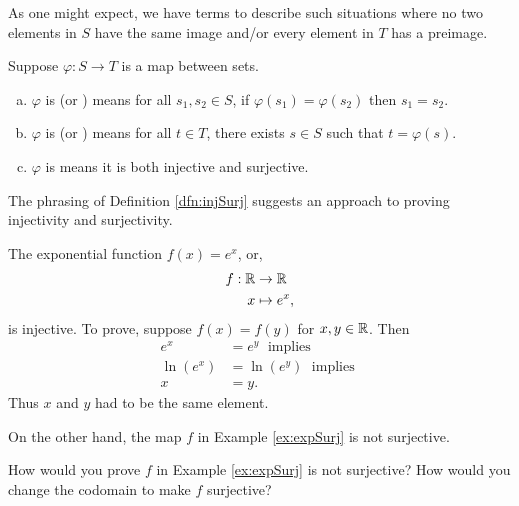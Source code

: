\documentclass[../UNABRIDGEDalgebraNotesMSRI-UP2016.tex]{subfiles}
\begin{document}
\begin{frame}
As one might expect, we have terms to describe such situations where no two elements in $S$ have the same image and/or every element in $T$ has a preimage.

\smallGap
\begin{dfn}\label{dfn:injSurj}
Suppose $\varphi:S\to T$ is a map between sets.
\begin{enumerate}[(a)]
\item\label{dfn:inj} $\varphi$ is  (or ) means for all $s_1,s_2\in S$, if $\varphi(s_1)=\varphi(s_2)$ then $s_1=s_2$.
\item\label{dfn:surj} $\varphi$ is  (or ) means for all $t\in T$, there exists $s\in S$ such that $t=\varphi(s)$.
\item $\varphi$ is  means it is both injective and surjective.
\end{enumerate}
\end{dfn}

\smallGap
The phrasing of Definition \ref{dfn:injSurj} suggests an approach to proving injectivity and surjectivity.
\end{frame}

\begin{frame}%
\begin{ex}\label{ex:expSurj}
The exponential function $f(x)=e^x$, or,  
\begin{align*}
f:\mathbb R &\to \mathbb R \\
 x &\mapsto e^x,
\end{align*}
is injective.  To prove, suppose $f(x)=f(y)$ for $x,y\in \mathbb R$.  Then 
\begin{align*}
e^x &= e^y\; \text{ implies } \\
\ln{(e^x)} &= \ln{(e^y)}\; \text{ implies } \\
x &= y. 
\end{align*}
Thus $x$ and $y$ had to be the same element.
\end{ex}
\end{frame}

\begin{frame}[c]
On the other hand, the map $f$ in Example \ref{ex:expSurj} is not surjective.

\smallGap
\begin{que}
How would you prove $f$ in Example \ref{ex:expSurj} is not surjective?  How would you change the codomain to make $f$ surjective?
\end{que}
\end{frame}
\end{document}
